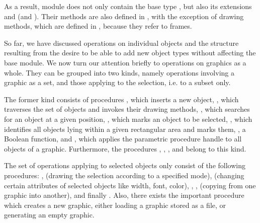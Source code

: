 
As a result, module  does not only contain the base type , but also its extensions  and  (and ). Their methods are also defined in , with the exception of drawing methods, which are defined in , because they refer to frames.

So far, we have discussed operations on individual objects and the structure resulting from the desire to be able to add new object types without affecting the base module. We now turn our attention briefly to operations on graphics as a whole. They can be grouped into two kinds, namely operations involving a graphic as a set, and those applying to the selection, i.e. to a subset only.

The former kind consists of procedures , which inserts a new object, , which traverses the set of objects and invokes their drawing methods, , which searches for an object at a given position, , which marks an object to be selected, , which identifies all objects lying within a given rectangular area and marks them, , a Boolean function, and , which applies the parametric procedure handle to all objects of a graphic. Furthermore, the procedures , , , and  belong to this kind.

The set of operations applying to selected objects only consist of the following procedures: ,  (drawing the selection according to a specified mode),  (changing certain attributes of selected objects like width, font, color), , ,  (copying from one graphic into another), and finally . Also, there exists the important procedure  which creates a new graphic, either loading a graphic stored as a file, or generating an empty graphic.

